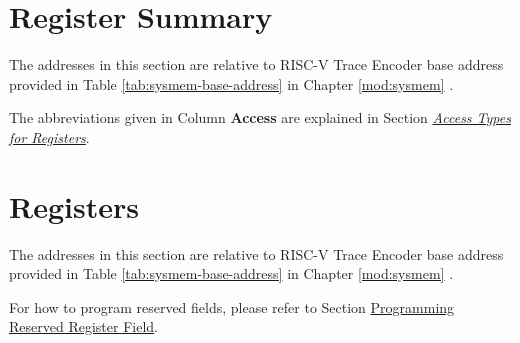 \documentclass[main\_\_EN.tex]{subfiles}
\begin{document}



\newpage
\hypertarget{riscvtracenc-reg-summ}{}
\section{Register Summary}
\label{sec:riscvtracenc-reg-summ}

The addresses in this section are relative to RISC-V Trace Encoder base address provided in Table \ref{tab:sysmem-base-address} in Chapter \ref{mod:sysmem} \textit{}.

The abbreviations given in Column \textbf{Access} are explained in Section \hyperref[glossary-access-types]{\textit{Access Types for Registers}}.






\newpage
\section{Registers}

The addresses in this section are relative to RISC-V Trace Encoder base address provided in Table \ref{tab:sysmem-base-address} in Chapter \ref{mod:sysmem} \textit{}.

For how to program reserved fields, please refer to Section \hyperref[programming-reserved-field]{Programming Reserved Register Field}.


\end{document}

